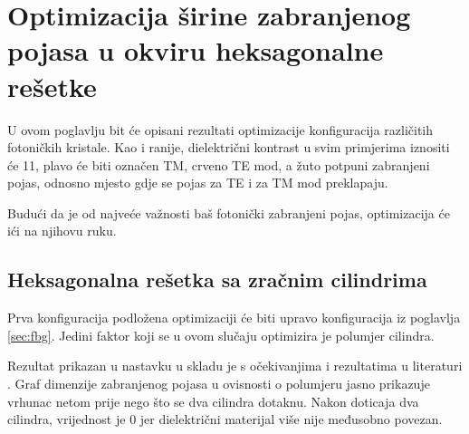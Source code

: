 \documentclass[utf8, seminar, numeric]{fer}
\begin{document}
\chapter{Optimizacija širine zabranjenog pojasa u okviru heksagonalne rešetke}

U ovom poglavlju bit će opisani rezultati optimizacije konfiguracija različitih
fotoničkih kristale. Kao i ranije, dielektrični kontrast u svim primjerima
iznositi će 11, plavo će biti označen TM, crveno TE mod, a žuto potpuni
zabranjeni pojas, odnosno mjesto gdje se pojas za TE i za TM mod preklapaju.

Budući da je od  najveće važnosti baš fotonički zabranjeni pojas, optimizacija
će ići na njihovu ruku.

\section{Heksagonalna rešetka sa zračnim cilindrima}\label{section:cyl}

Prva konfiguracija podložena optimizaciji će biti upravo konfiguracija iz
poglavlja \ref{sec:fbg}. Jedini faktor koji se u ovom slučaju optimizira je
polumjer cilindra.

Rezultat prikazan u nastavku u skladu je s očekivanjima i rezultatima u literaturi
\cite{joannopoulos2011photonic}. Graf dimenzije zabranjenog pojasa  u ovisnosti o
polumjeru jasno prikazuje vrhunac netom prije nego što se dva cilindra dotaknu.
Nakon doticaja dva cilindra, vrijednost je 0 jer dielektrični materijal više nije
međusobno povezan.
\end{document}
